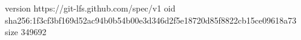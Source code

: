 version https://git-lfs.github.com/spec/v1
oid sha256:1f3cf3bf169d52ac94b0b54b00e3d346d2f5e18720d85f8822cb15ce09618a73
size 349692
